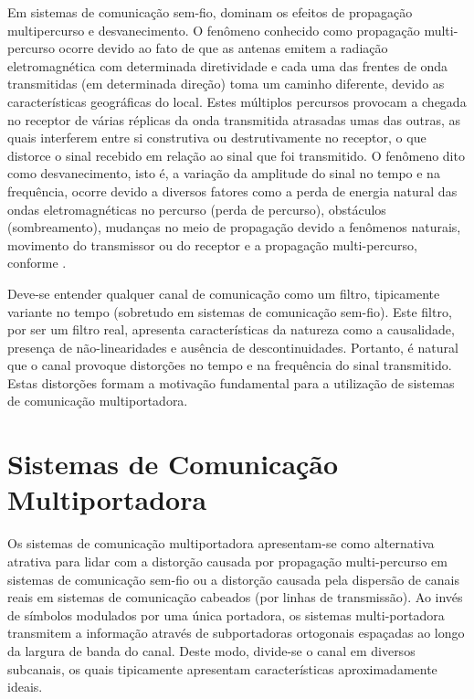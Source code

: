 Em sistemas de comunicação sem-fio, dominam os efeitos de propagação multipercurso e desvanecimento. O fenômeno conhecido como propagação multi-percurso ocorre devido ao fato de que as antenas emitem a radiação eletromagnética com determinada diretividade e cada uma das frentes de onda transmitidas (em determinada direção) toma um caminho diferente, devido as características geográficas do local. Estes múltiplos percursos provocam a chegada no receptor de várias réplicas da onda transmitida atrasadas umas das outras, as quais interferem entre si construtiva ou destrutivamente no receptor, o que distorce o sinal recebido em relação ao sinal que foi transmitido. O fenômeno dito como desvanecimento, isto é, a variação da amplitude do sinal no tempo e na frequência, ocorre devido a diversos fatores como a perda de energia natural das ondas eletromagnéticas no percurso (perda de percurso), obstáculos (sombreamento), mudanças no meio de propagação devido a fenômenos naturais, movimento do transmissor ou do receptor e a propagação multi-percurso, conforme \cite{cho_ofdm}.

Deve-se entender qualquer canal de comunicação como um filtro, tipicamente variante no tempo (sobretudo em sistemas de comunicação sem-fio). Este filtro, por ser um filtro real, apresenta características da natureza como a causalidade, presença de não-linearidades e ausência de descontinuidades. Portanto, é natural que o canal provoque distorções no tempo e na frequência do sinal transmitido. Estas distorções formam a motivação fundamental para a utilização de sistemas de comunicação multiportadora.

\section{Sistemas de Comunicação Multiportadora}
\label{sec:sistemas_multiportadora}

Os sistemas de comunicação multiportadora apresentam-se como alternativa atrativa para lidar com a distorção causada por propagação multi-percurso em sistemas de comunicação sem-fio ou a distorção causada pela dispersão de canais reais em sistemas de comunicação cabeados (por linhas de transmissão). Ao invés de símbolos modulados por uma única portadora, os sistemas multi-portadora transmitem a informação através de subportadoras ortogonais espaçadas ao longo da largura de banda do canal. Deste modo, divide-se o canal em diversos subcanais, os quais tipicamente apresentam características aproximadamente ideais.

